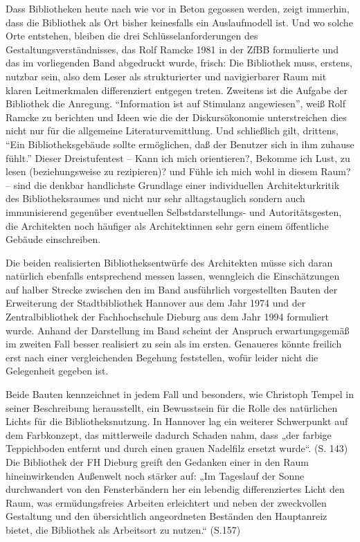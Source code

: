 \documentclass[a4paper,
fontsize=11pt,
oneside,
numbers=noperiodatend,
parskip=half-,
bibliography=totoc,
final
]{scrartcl}
\begin{document}
Dass Bibliotheken heute nach wie vor in Beton gegossen werden, zeigt
immerhin, dass die Bibliothek als Ort bisher keinesfalls ein
Auslaufmodell ist. Und wo solche Orte entstehen, bleiben die drei
Schlüsselanforderungen des Gestaltungsverständnisses, das Rolf Ramcke
1981 in der ZfBB formulierte und das im vorliegenden Band abgedruckt
wurde, frisch: Die Bibliothek muss, erstens, nutzbar sein, also dem
Leser als strukturierter und navigierbarer Raum mit klaren Leitmerkmalen
differenziert entgegen treten. Zweitens ist die Aufgabe der Bibliothek
die Anregung. \enquote{Information ist auf Stimulanz angewiesen}, weiß
Rolf Ramcke zu berichten und Ideen wie die der Diskursökonomie
unterstreichen dies nicht nur für die allgemeine Literaturvemittlung.
Und schließlich gilt, drittens, \enquote{Ein Bibliotheksgebäude sollte
ermöglichen, daß der Benutzer sich in ihm zuhause fühlt.} Dieser
Dreistufentest -- Kann ich mich orientieren?, Bekomme ich Lust, zu lesen
(beziehungsweise zu rezipieren)? und Fühle ich mich wohl in diesem Raum?
-- sind die denkbar handlichste Grundlage einer individuellen
Architekturkritik des Bibliotheksraumes und nicht nur sehr
alltagstauglich sondern auch immunisierend gegenüber eventuellen
Selbstdarstellungs- und Autoritätsgesten, die Architekten noch häufiger
als Architektinnen sehr gern einem öffentliche Gebäude einschreiben.

Die beiden realisierten Bibliotheksentwürfe des Architekten müsse sich
daran natürlich ebenfalls entsprechend messen lassen, wenngleich die
Einschätzungen auf halber Strecke zwischen den im Band ausführlich
vorgestellten Bauten der Erweiterung der Stadtbibliothek Hannover aus
dem Jahr 1974 und der Zentralbibliothek der Fachhochschule Dieburg aus
dem Jahr 1994 formuliert wurde. Anhand der Darstellung im Band scheint
der Anspruch erwartungsgemäß im zweiten Fall besser realisiert zu sein
als im ersten. Genaueres könnte freilich erst nach einer vergleichenden
Begehung feststellen, wofür leider nicht die Gelegenheit gegeben ist.

Beide Bauten kennzeichnet in jedem Fall und besonders, wie Christoph
Tempel in seiner Beschreibung herausstellt, ein Bewusstsein für die
Rolle des natürlichen Lichts für die Bibliotheksnutzung. In Hannover lag
ein weiterer Schwerpunkt auf dem Farbkonzept, das mittlerweile dadurch
Schaden nahm, dass „der farbige Teppichboden entfernt und durch einen
grauen Nadelfilz ersetzt wurde``. (S. 143) Die Bibliothek der FH Dieburg
greift den Gedanken einer in den Raum hineinwirkenden Außenwelt noch
stärker auf: „Im Tageslauf der Sonne durchwandert von den Fensterbändern
her ein lebendig differenziertes Licht den Raum, was ermüdungsfreies
Arbeiten erleichtert und neben der zweckvollen Gestaltung und den
übersichtlich angeordneten Beständen den Hauptanreiz bietet, die
Bibliothek als Arbeitsort zu nutzen.`` (S.157)
\end{document}
